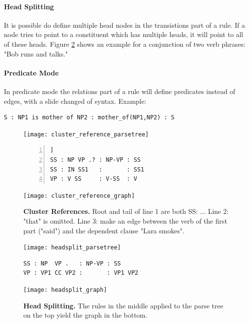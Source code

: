 \documentclass[english]{article}
\begin{document}
\paragraph{Head Splitting}
It is possible do define multiple head nodes in the transistions part of a rule. If a node tries to point to a constituent which has multiple heads, it will point to all of these heads. Figure \ref{fig:head-splitting} shows an example for a conjunction of two verb phrases: "Bob runs and talks."  

\paragraph{Predicate Mode}
In predicate mode the relations part of a rule will define predicates instead of edges, with a slide changed of syntax. Example: 
\begin{lstlisting}
S : NP1 is mother of NP2 : mother_of(NP1,NP2) : S
\end{lstlisting}

\begin{landscape}
\centering
\begin{minipage}{0.45\linewidth}%
  \centering
  \begin{figure}[H]
  \centering
  \texttt{[image: cluster\_reference\_parsetree]}
  \begin{lstlisting}[frame=tb, numbers=left, keepspaces=true,   ]]
SS : NP VP .? : NP-VP : SS
SS : IN SS1   :       : SS1
VP : V SS     : V-SS  : V\end{lstlisting}
  \texttt{[image: cluster\_reference\_graph]}
  \caption{\textbf{Cluster References.} Root and tail of line 1 are both SS: ... Line 2: "that" is omitted. Line 3: make an edge between the verb of the first part ("said") and the dependent clause "Lara smokes". }
  \label{fig:cluster-ref}
  \end{figure}
\end{minipage}%
\hspace{0.05\linewidth}
\begin{minipage}{0.45\linewidth}%
  \centering
  \begin{figure}[H]
  \centering
  \texttt{[image: headsplit\_parsetree]}
  \begin{lstlisting}[frame=tb, keepspaces=true, xleftmargin=.01\textwidth, xrightmargin=.01\textwidth] 
SS : NP  VP .   : NP-VP : SS
VP : VP1 CC VP2 :       : VP1 VP2\end{lstlisting}
  \texttt{[image: headsplit\_graph]}
  \caption{\textbf{Head Splitting.} The rules in the middle applied to the parse tree on the top yield the graph in the bottom.}
  \label{fig:head-splitting}
  \end{figure}
\end{minipage}
\end{landscape}
\end{document}
